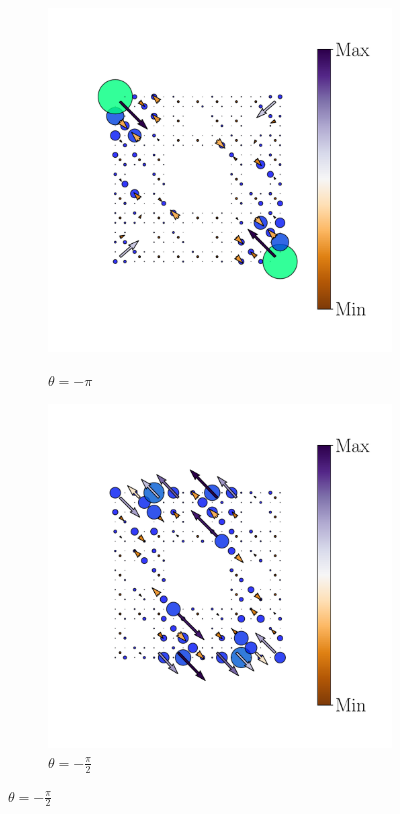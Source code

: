 \begin{figure}[h!]
     \centering
    \captionsetup[sub]{font=small}
     \begin{minipage}[h!]{1.1\textwidth}
         \begin{subfigure}[b!]{0.2 \textwidth}
             \caption{$\theta = -\pi$}
             \includegraphics[width=\textwidth]{Imagenes/Resultados_pump_Fractal/x/hoti_pomp_x_pos1.pdf}
             \label{}
         \end{subfigure}\hspace*{-0.5em}
          \begin{subfigure}[b!]{0.2 \textwidth}
             \caption*{$\theta = -\frac{\pi}{2}$}
             \includegraphics[width=\textwidth]{Imagenes/Resultados_pump_Fractal/x/hoti_pomp_x_pos2.pdf}

\end{subfigure}
\end{minipage}
\end{figure}
